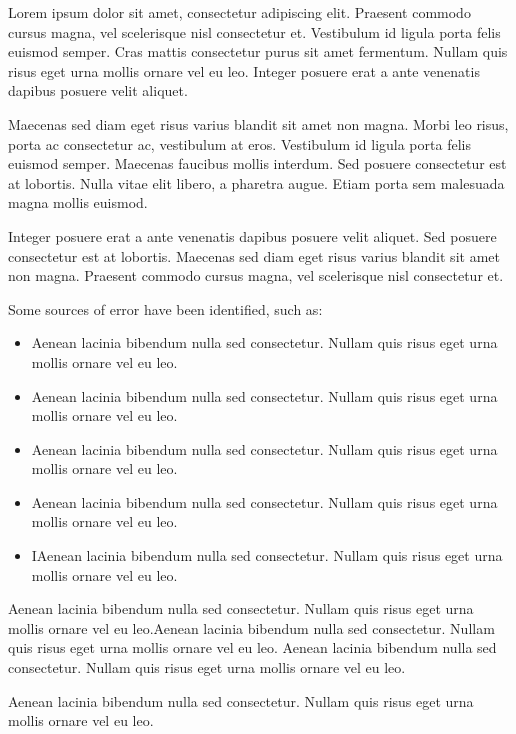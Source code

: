\documentclass[journal]{../template/IEEEtran}
\begin{document}
Lorem ipsum dolor sit amet, consectetur adipiscing elit. Praesent commodo cursus magna, vel scelerisque nisl consectetur et. Vestibulum id ligula porta felis euismod semper. Cras mattis consectetur purus sit amet fermentum. Nullam quis risus eget urna mollis ornare vel eu leo. Integer posuere erat a ante venenatis dapibus posuere velit aliquet.

Maecenas sed diam eget risus varius blandit sit amet non magna. Morbi leo risus, porta ac consectetur ac, vestibulum at eros. Vestibulum id ligula porta felis euismod semper. Maecenas faucibus mollis interdum. Sed posuere consectetur est at lobortis. Nulla vitae elit libero, a pharetra augue. Etiam porta sem malesuada magna mollis euismod.

Integer posuere erat a ante venenatis dapibus posuere velit aliquet. Sed posuere consectetur est at lobortis. Maecenas sed diam eget risus varius blandit sit amet non magna. Praesent commodo cursus magna, vel scelerisque nisl consectetur et.

Some sources of error have been identified, such as:
\begin{itemize}
	\item Aenean lacinia bibendum nulla sed consectetur. Nullam quis risus eget urna mollis ornare vel eu leo.
	\item Aenean lacinia bibendum nulla sed consectetur. Nullam quis risus eget urna mollis ornare vel eu leo.
	\item Aenean lacinia bibendum nulla sed consectetur. Nullam quis risus eget urna mollis ornare vel eu leo.
	\item Aenean lacinia bibendum nulla sed consectetur. Nullam quis risus eget urna mollis ornare vel eu leo.	
	\item IAenean lacinia bibendum nulla sed consectetur. Nullam quis risus eget urna mollis ornare vel eu leo.
\end{itemize}

Aenean lacinia bibendum nulla sed consectetur. Nullam quis risus eget urna mollis ornare vel eu leo.Aenean lacinia bibendum nulla sed consectetur. Nullam quis risus eget urna mollis ornare vel eu leo.
Aenean lacinia bibendum nulla sed consectetur. Nullam quis risus eget urna mollis ornare vel eu leo.

Aenean lacinia bibendum nulla sed consectetur. Nullam quis risus eget urna mollis ornare vel eu leo.
\end{document}
